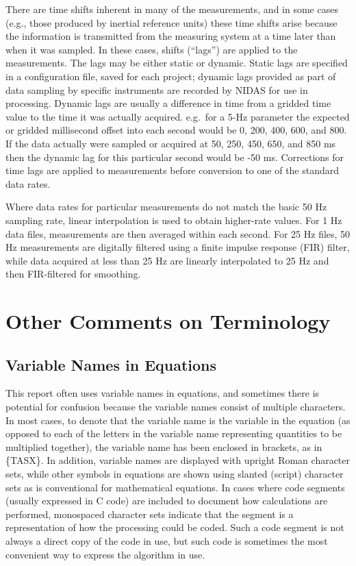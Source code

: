 \documentclass[
]{book}
\begin{document}
There are time shifts inherent in many of the measurements, and in some cases (e.g., those produced by inertial reference units) these time shifts arise because the information is transmitted from the measuring system at a time later than when it was sampled. In these cases, shifts (``lags'') are applied to the measurements. The lags may be either static or dynamic. Static lags are specified in a configuration file, saved for each project; dynamic lags provided as part of data sampling by specific instruments are recorded by NIDAS for use in processing. Dynamic lags are usually a difference in time from a gridded time value to the time it was actually acquired. e.g.~for a 5-Hz parameter the expected or gridded millisecond offset into each second would be 0, 200, 400, 600, and 800. If the data actually were sampled or acquired at 50, 250, 450, 650, and 850 ms then the dynamic lag for this particular second would be -50 ms. Corrections for time lags are applied to measurements before conversion to one of the standard data rates.

\protect\hypertarget{elecFilter}{}{Where data rates for particular measurements do not match the basic 50 Hz sampling rate, linear interpolation is used to obtain higher-rate values. For 1 Hz data files, measurements are then averaged within each second. For 25 Hz files, 50 Hz measurements are digitally filtered using a finite impulse response (FIR) filter, while data acquired at less than 25 Hz are linearly interpolated to 25 Hz and then FIR-filtered for smoothing.}

\hypertarget{other-comments-on-terminology}{%
\section{Other Comments on Terminology}\label{other-comments-on-terminology}}

\hypertarget{variable-names-in-equations}{%
\subsection{Variable Names in Equations}\label{variable-names-in-equations}}

This report often uses variable names in equations, and sometimes there is potential for confusion because the variable names consist of multiple characters. In most cases, to denote that the variable name is the variable in the equation (as opposed to each of the letters in the variable name representing quantities to be multiplied together), the variable name has been enclosed in brackets, as in \{TASX\}. In addition, variable names are displayed with upright Roman character sets, while other symbols in equations are shown using slanted (script) character sets as is conventional for mathematical equations. In cases where code segments (usually expressed in C code) are included to document how calculations are performed, monospaced character sets indicate that the segment is a representation of how the processing could be coded. Such a code segment is not always a direct copy of the code in use, but such code is sometimes the most convenient way to express the algorithm in use.
\end{document}

